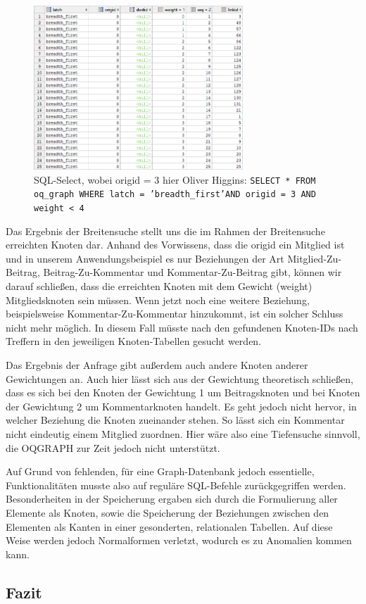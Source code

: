 \begin{figure}	
	\centering
	\includegraphics[width=0.7\textwidth]{images/oqgraph-select.png}
	\caption{SQL-Select, wobei origid = 3 hier Oliver Higgins: \newline
		\texttt{SELECT * FROM oq\_graph WHERE latch = 'breadth\_first'\newline AND origid = 3 AND weight < 4}
	}
\end{figure}

Das Ergebnis der Breitensuche stellt uns die im Rahmen der Breitensuche erreichten Knoten dar. Anhand des Vorwissens, dass die origid ein Mitglied ist und in unserem Anwendungsbeispiel es nur Beziehungen der Art Mitglied-Zu-Beitrag, Beitrag-Zu-Kommentar und Kommentar-Zu-Beitrag gibt, können wir darauf schließen, dass die erreichten Knoten mit dem Gewicht (weight) Mitgliedsknoten sein müssen. Wenn jetzt noch eine weitere Beziehung, beispielsweise \grqq Kommentar-Zu-Kommentar\grqq{} hinzukommt, ist ein solcher Schluss nicht mehr möglich. In diesem Fall müsste nach den gefundenen Knoten-IDs nach Treffern in den jeweiligen Knoten-Tabellen gesucht werden.

Das Ergebnis der Anfrage gibt außerdem auch andere Knoten anderer Gewichtungen an. Auch hier lässt sich aus der Gewichtung theoretisch schließen, dass es sich bei den Knoten der Gewichtung 1 um Beitragsknoten und bei Knoten der Gewichtung 2 um Kommentarknoten handelt. Es geht jedoch nicht hervor, in welcher Beziehung die Knoten zueinander stehen. So lässt sich ein Kommentar nicht eindeutig einem Mitglied zuordnen. Hier wäre also eine Tiefensuche sinnvoll, die OQGRAPH zur Zeit jedoch nicht unterstützt.

Auf Grund von fehlenden, für eine Graph-Datenbank jedoch essentielle, Funktionalitäten musste also auf reguläre SQL-Befehle zurückgegriffen werden. Besonderheiten in der Speicherung ergaben sich durch die Formulierung aller Elemente als Knoten, sowie die Speicherung der Beziehungen zwischen den Elementen als Kanten in einer gesonderten, relationalen Tabellen. Auf diese Weise werden jedoch Normalformen verletzt, wodurch es zu Anomalien kommen kann.

\subsection{Fazit}
